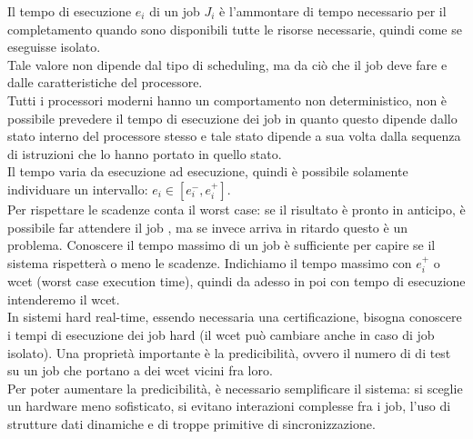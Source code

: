 \documentclass{article}
\begin{document}
Il tempo di esecuzione $e_i$ di un job $J_i$ è l'ammontare di tempo necessario per il completamento quando sono disponibili tutte le risorse necessarie, quindi come se eseguisse isolato.\\ Tale valore non dipende dal tipo di scheduling, ma da ciò che il job deve fare e dalle caratteristiche del processore.\\ Tutti i processori moderni hanno un comportamento non deterministico, non è possibile prevedere il tempo di esecuzione dei job in quanto questo dipende dallo stato interno del processore stesso e tale stato dipende a sua volta dalla sequenza di istruzioni che lo hanno portato in quello stato.\\ Il tempo varia da esecuzione ad esecuzione, quindi è possibile solamente individuare un intervallo: $e_i \in [e_i^{-}, e_i^{+}]$.\\ Per rispettare le scadenze conta il worst case: se il risultato è pronto in anticipo, è possibile far attendere il job , ma se invece arriva in ritardo questo è un problema. Conoscere il tempo massimo di un job è sufficiente per capire se il sistema rispetterà o meno le scadenze. Indichiamo il tempo massimo con $e_i^{+}$ o wcet (worst case execution time), quindi da adesso in poi con tempo di esecuzione intenderemo il wcet.\\ In sistemi hard real-time, essendo necessaria una certificazione, bisogna conoscere i tempi di esecuzione dei job hard (il wcet può cambiare anche in caso di job isolato). Una proprietà importante è la predicibilità, ovvero il numero di di test su un job che portano a dei wcet vicini fra loro.\\ Per poter aumentare la predicibilità, è necessario semplificare il sistema: si sceglie un hardware meno sofisticato, si evitano interazioni complesse fra i job, l'uso di strutture dati dinamiche e di troppe primitive di sincronizzazione.
\end{document}
